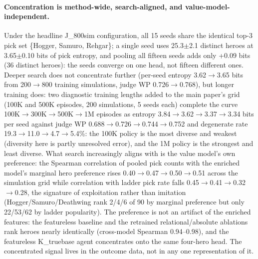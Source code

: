 \documentclass[journal]{IEEEtran}
\begin{document}
\paragraph{Concentration is method-wide, search-aligned, and value-model-independent.} Under the headline J\_800sim configuration, all 15 seeds share the identical top-3 pick set \{Hogger, Samuro, Rehgar\}; a single seed uses 25.3$\pm$2.1 distinct heroes at 3.65$\pm$0.10 bits of pick entropy, and pooling all fifteen seeds adds only +0.09 bits (36 distinct heroes): the seeds converge on one head, not fifteen different ones. Deeper search does not concentrate further (per-seed entropy 3.62$\to$3.65 bits from 200$\to$800 training simulations, judge WP 0.726$\to$0.768), but longer training does: two diagnostic training lengths added to the main paper's grid (100K and 500K episodes, 200 simulations, 5 seeds each) complete the curve 100K$\to$300K$\to$500K$\to$1M episodes as entropy 3.84$\to$3.62$\to$3.37$\to$3.34 bits per seed against judge WP 0.688$\to$0.726$\to$0.744$\to$0.752 and degenerate rate 19.3$\to$11.0$\to$4.7$\to$5.4\%: the 100K policy is the most diverse and weakest (diversity here is partly unresolved error), and the 1M policy is the strongest and least diverse. What search increasingly aligns with is the value model's own preference: the Spearman correlation of pooled pick counts with the enriched model's marginal hero preference rises 0.40$\to$0.47$\to$0.50$\to$0.51 across the simulation grid while correlation with ladder pick rate falls 0.45$\to$0.41$\to$0.32$\to$0.28, the signature of exploitation rather than imitation (Hogger/Samuro/Deathwing rank 2/4/6 of 90 by marginal preference but only 22/53/62 by ladder popularity). The preference is not an artifact of the enriched features: the featureless baseline and the retrained relational/absolute ablations rank heroes nearly identically (cross-model Spearman 0.94--0.98), and the featureless K\_truebase agent concentrates onto the same four-hero head. The concentrated signal lives in the outcome data, not in any one representation of it.
\end{document}
